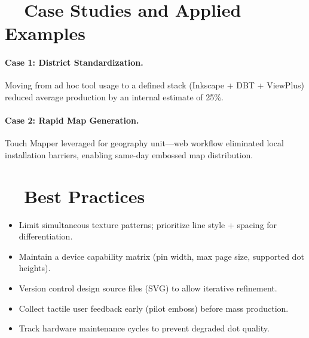 \section{~~Case Studies and Applied Examples}\label{ch14:sec:case-studies}
\paragraph{Case 1: District Standardization.} Moving from ad hoc tool usage to a defined stack (Inkscape + DBT + ViewPlus) reduced average production  by an internal estimate of 25\%.
\paragraph{Case 2: Rapid Map Generation.} Touch Mapper leveraged for geography unit—web workflow eliminated local installation barriers, enabling same-day embossed map distribution.

\section{~~Best Practices}\label{ch14:sec:best-practices}
\begin{itemize}
	\item Limit simultaneous texture patterns; prioritize line style + spacing for differentiation.
	\item Maintain a device capability matrix (pin width, max page size, supported dot heights).
	\item Version control design source files (SVG) to allow iterative refinement.
	\item Collect tactile user feedback early (pilot emboss) before mass production.
	\item Track hardware maintenance cycles to prevent degraded dot quality.
\end{itemize}


